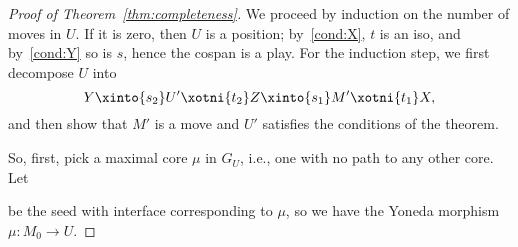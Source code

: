 \documentclass{LMCS}
\theoremstyle{plain}\newtheorem{satz}[thm]{Satz}
\begin{document}
\begin{proof}[Proof of Theorem~\ref{thm:completeness}]
  We proceed by induction on the number of moves in $U$. If it is
  zero, then $U$ is a position; by~\ref{cond:X}, $t$ is an iso, and
  by~\ref{cond:Y} so is $s$, hence the cospan is a play. For the
  induction step, we first decompose $U$ into
  $$Y \xinto{s_2} U' \xotni{t_2} Z \xinto{s_1} M' \xotni{t_1} X,$$
  and then show that $M'$ is a move and $U'$ satisfies the
  conditions of the theorem. 

  So, first, pick a maximal core $\mu$ in $G_U$, i.e., one with no
  path to any other core. Let
  \begin{center}
  \end{center}
  be the seed with interface corresponding to $\mu$, so
  we have the Yoneda morphism $\mu \colon M_0 \to U$.


\end{proof}
\end{document}
